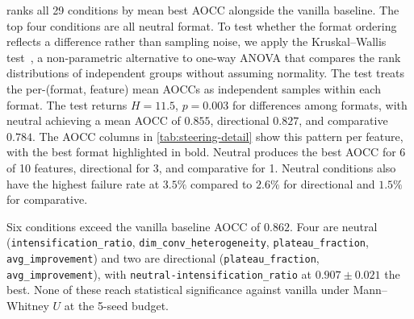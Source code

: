  ranks all 29 conditions by mean best AOCC alongside the vanilla baseline. The top four conditions are all neutral format. To test whether the format ordering reflects a difference rather than sampling noise, we apply the Kruskal--Wallis test~\cite{kruskal1952ranks}, a non-parametric alternative to one-way ANOVA that compares the rank distributions of independent groups without assuming normality. The test treats the per-(format, feature) mean AOCCs as independent samples within each format. The test returns $H = 11.5$, $p = 0.003$ for differences among formats, with neutral achieving a mean AOCC of $0.855$, directional $0.827$, and comparative $0.784$. The AOCC columns in \cref{tab:steering-detail} show this pattern per feature, with the best format highlighted in bold. Neutral produces the best AOCC for 6 of 10 features, directional for 3, and comparative for 1. Neutral conditions also have the highest failure rate at $3.5\%$ compared to $2.6\%$ for directional and $1.5\%$ for comparative.

Six conditions exceed the vanilla baseline AOCC of $0.862$. Four are neutral (\texttt{intensification\_ratio}, \texttt{dim\_conv\_heterogeneity}, \texttt{plateau\_fraction}, \texttt{avg\_improvement}) and two are directional (\texttt{plateau\_fraction}, \texttt{avg\_improvement}), with \texttt{neutral-intensification\_ratio} at $0.907 \pm 0.021$ the best. None of these reach statistical significance against vanilla under Mann--Whitney $U$ at the 5-seed budget.

